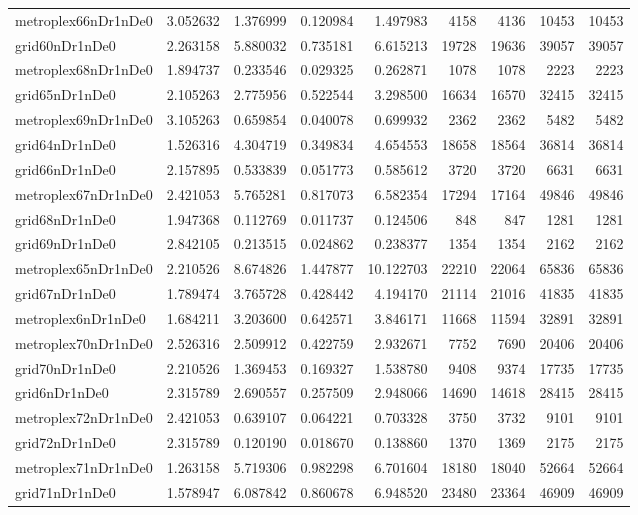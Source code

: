\begin{longtable}{|l|r|r|r|r|r|r|r|r|}
metroplex66nDr1nDe0 & 3.052632 & 1.376999 & 0.120984 & 1.497983 & 4158 & 4136 & 10453 & 10453 \\
grid60nDr1nDe0 & 2.263158 & 5.880032 & 0.735181 & 6.615213 & 19728 & 19636 & 39057 & 39057 \\
metroplex68nDr1nDe0 & 1.894737 & 0.233546 & 0.029325 & 0.262871 & 1078 & 1078 & 2223 & 2223 \\
grid65nDr1nDe0 & 2.105263 & 2.775956 & 0.522544 & 3.298500 & 16634 & 16570 & 32415 & 32415 \\
metroplex69nDr1nDe0 & 3.105263 & 0.659854 & 0.040078 & 0.699932 & 2362 & 2362 & 5482 & 5482 \\
grid64nDr1nDe0 & 1.526316 & 4.304719 & 0.349834 & 4.654553 & 18658 & 18564 & 36814 & 36814 \\
grid66nDr1nDe0 & 2.157895 & 0.533839 & 0.051773 & 0.585612 & 3720 & 3720 & 6631 & 6631 \\
metroplex67nDr1nDe0 & 2.421053 & 5.765281 & 0.817073 & 6.582354 & 17294 & 17164 & 49846 & 49846 \\
grid68nDr1nDe0 & 1.947368 & 0.112769 & 0.011737 & 0.124506 & 848 & 847 & 1281 & 1281 \\
grid69nDr1nDe0 & 2.842105 & 0.213515 & 0.024862 & 0.238377 & 1354 & 1354 & 2162 & 2162 \\
metroplex65nDr1nDe0 & 2.210526 & 8.674826 & 1.447877 & 10.122703 & 22210 & 22064 & 65836 & 65836 \\
grid67nDr1nDe0 & 1.789474 & 3.765728 & 0.428442 & 4.194170 & 21114 & 21016 & 41835 & 41835 \\
metroplex6nDr1nDe0 & 1.684211 & 3.203600 & 0.642571 & 3.846171 & 11668 & 11594 & 32891 & 32891 \\
metroplex70nDr1nDe0 & 2.526316 & 2.509912 & 0.422759 & 2.932671 & 7752 & 7690 & 20406 & 20406 \\
grid70nDr1nDe0 & 2.210526 & 1.369453 & 0.169327 & 1.538780 & 9408 & 9374 & 17735 & 17735 \\
grid6nDr1nDe0 & 2.315789 & 2.690557 & 0.257509 & 2.948066 & 14690 & 14618 & 28415 & 28415 \\
metroplex72nDr1nDe0 & 2.421053 & 0.639107 & 0.064221 & 0.703328 & 3750 & 3732 & 9101 & 9101 \\
grid72nDr1nDe0 & 2.315789 & 0.120190 & 0.018670 & 0.138860 & 1370 & 1369 & 2175 & 2175 \\
metroplex71nDr1nDe0 & 1.263158 & 5.719306 & 0.982298 & 6.701604 & 18180 & 18040 & 52664 & 52664 \\
grid71nDr1nDe0 & 1.578947 & 6.087842 & 0.860678 & 6.948520 & 23480 & 23364 & 46909 & 46909 \\

\end{longtable}
